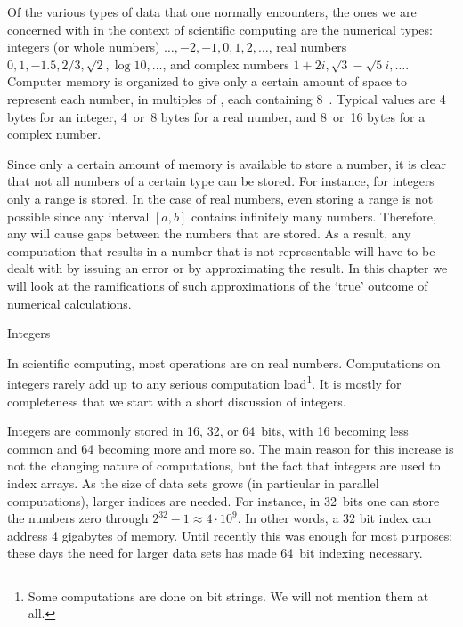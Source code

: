 
Of the various types of data that one normally encounters, the ones we
are concerned with in the context of scientific computing are the
numerical types: integers (or whole numbers)
$\ldots,-2,-1,0,1,2,\ldots$, real numbers $0,1,-1.5,2/3,\sqrt 2,\log
10,\ldots$, and complex numbers $1+2i,\sqrt 3-\sqrt 5i,\ldots$.
Computer memory is organized to give only a certain amount of space to
represent each number, in multiples of , each
containing 8~. Typical values are 4 bytes for an
integer,  4~or~8 bytes for a real number, and 8~or~16 bytes for a
complex number.

Since only a certain amount of memory is available to store a number,
it is clear that not all numbers of a certain type can be stored. For
instance, for integers only a range is stored. In the case of real
numbers, even storing a range is not possible since any interval $[a,b]$
contains infinitely many numbers. Therefore, any
 will cause gaps between the
numbers that are stored. As a result, any computation that results in
a number that is not representable will have to be dealt with by issuing an
error or by approximating the result. In this chapter we will look at
the ramifications of such approximations of the `true' outcome of
numerical calculations.

 {Integers}

In scientific computing, most operations are on real
numbers. Computations on integers rarely add up to any serious
computation load\footnote{Some computations are done on bit
  strings. We will not mention them at all.}. It is mostly for
completeness that we start with a short discussion of integers.

Integers are commonly stored in 16, 32, or 64~bits, with 16 becoming
less common and 64 becoming more and more so. The main reason for this increase is
not the changing nature of computations, but the fact that integers
are used to index arrays. As the size of data sets grows (in
particular in parallel computations), larger indices are needed. For
instance, in 32~bits one can store the numbers zero through
$2^{32}-1\approx 4\cdot 10^9$. In other words, a 32 bit index can
address 4 gigabytes of memory. Until recently this was enough for most
purposes; these days the need for larger data sets has made 64~bit
indexing necessary.

